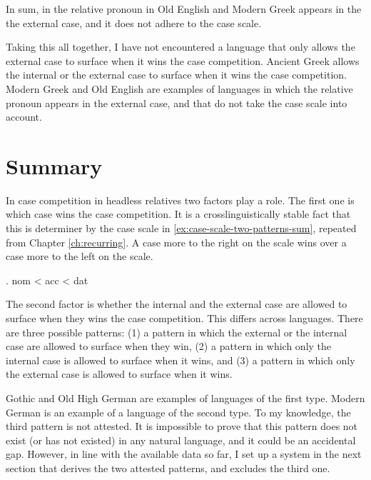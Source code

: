 In sum, in the relative pronoun in Old English and Modern Greek appears in the the external case, and it does not adhere to the case scale.

Taking this all together, I have not encountered a language that only allows the external case to surface when it wins the case competition. Ancient Greek allows the internal or the external case to surface when it wins the case competition. Modern Greek and Old English are examples of languages in which the relative pronoun appears in the external case, and that do not take the case scale into account.


\section{Summary}\label{sec:summary-2-patterns}

In case competition in headless relatives two factors play a role. The first one is which case wins the case competition. It is a crosslinguistically stable fact that this is determiner by the case scale in \ref{ex:case-scale-two-patterns-sum}, repeated from Chapter \ref{ch:recurring}. A case more to the right on the scale wins over a case more to the left on the scale.

\ex. \ac{nom} < \ac{acc} < \ac{dat}\label{ex:case-scale-two-patterns-sum}

The second factor is whether the internal and the external case are allowed to surface when they wins the case competition. This differs across languages. There are three possible patterns: (1) a pattern in which the external or the internal case are allowed to surface when they win, (2) a pattern in which only the internal case is allowed to surface when it wins, and (3) a pattern in which only the external case is allowed to surface when it wins.

Gothic and Old High German are examples of languages of the first type. Modern German is an example of a language of the second type. To my knowledge, the third pattern is not attested. It is impossible to prove that this pattern does not exist (or has not existed) in any natural language, and it could be an accidental gap. However, in line with the available data so far, I set up a system in the next section that derives the two attested patterns, and excludes the third one.
